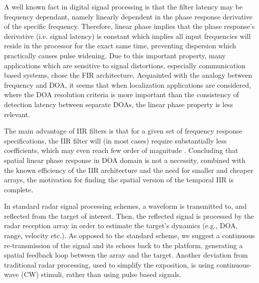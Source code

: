 A well known \cite{oppenheim1975digital} fact in digital signal processing is that the filter latency may be frequency dependant, namely linearly dependent in the phase response derivative of the specific frequency.
Therefore, linear phase implies that the phase response's derivative (i.e. signal latency) is constant which implies all input frequencies will reside in the processor for the exact same time, preventing dispersion which practically causes pulse widening.
Due to this important property, many applications which are sensitive to signal distortions, especially communication based systems, chose the FIR architecture.
Acquainted with the analogy between frequency and DOA, it seems that when localization applications are considered, where the DOA resolution criteria is more important than the consistency of detection latency between separate DOAs, the linear phase property is less relevant.
\par The main advantage of IIR filters is that for a given set of frequency response specifications, the IIR filter will (in most cases) require substantially less coefficients, which may even reach few order of magnitude \cite{rabiner1974some}.
Concluding that spatial linear phase response in DOA domain is not a necessity, combined with the known efficiency of the IIR architecture and the need for smaller and cheaper arrays, the motivation for finding the spatial version of the temporal IIR is complete.
\par In standard radar signal processing schemes, a waveform is transmitted to, and reflected from the target of interest. Then, the reflected signal is processed by the radar reception array in order to estimate the target's dynamics (e.g., DOA, range, velocity etc.).
As opposed to the standard scheme, we suggest a continuous re-transmission of the signal and its echoes back to the platform, generating a spatial feedback loop between the array and the target.
Another deviation from traditional radar processing, used to simplify the exposition, is using continuous-wave (CW) stimuli, rather than using pulse based signals. 